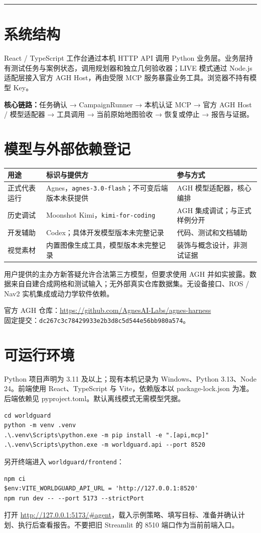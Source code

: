 \documentclass[UTF8,10pt,a4paper]{ctexart}
\newcommand{\cover}[2]{\vspace*{5mm}{\small\textcolor{teal}{WORLDGUARD / SUBMISSION 2026}}\par\vspace{4mm}{\huge\bfseries\color{ink}#1}\par\vspace{3mm}{\large #2}\par\vspace{4mm}\hrule\vspace{5mm}}
\begin{document}
\cover{技术信息与复现指南}{执行链、模型登记、环境与复核步骤}
\section{系统结构}
React / TypeScript 工作台通过本机 HTTP API 调用 Python 业务层。业务层持有测试任务与案例状态，调用规划器和独立几何验收器；LIVE 模式通过 Node.js 适配层接入官方 AGH Host，再由受限 MCP 服务暴露业务工具。浏览器不持有模型 Key。

\textbf{核心链路：}任务确认 → CampaignRunner → 本机认证 MCP → 官方 AGH Host / 模型适配器 → 工具调用 → 当前原始地图验收 → 恢复或停止 → 报告与证据。
\section{模型与外部依赖登记}
\par
\begin{tabularx}{\linewidth}{p{28mm}Xp{37mm}}\toprule
用途 & 标识与提供方 & 参与方式\\\midrule
正式代表运行 & Agnes，\texttt{agnes-3.0-flash}；不可变后端版本未获提供 & AGH 模型适配器，核心编排\\
历史调试 & Moonshot Kimi，\texttt{kimi-for-coding} & AGH 集成调试；与正式样例分开\\
开发辅助 & Codex；具体开发模型版本未完整记录 & 代码、测试和文档辅助\\
视觉素材 & 内置图像生成工具，模型版本未完整记录 & 装饰与概念设计，非测试证据\\\bottomrule
\end{tabularx}\par

用户提供的主办方新答疑允许合法第三方模型，但要求使用 AGH 并如实披露。数据来自自建合成网格和测试输入；无外部真实仓库数据集。无设备接口、ROS / Nav2 实机集成或动力学软件依赖。

官方 AGH 仓库：\url{https://github.com/AgnesAI-Labs/agnes-harness}\\
固定提交：\texttt{dc267c3c78429933e2b3d8c5d544e56bb980a574}。
\section{可运行环境}
Python 项目声明为 3.11 及以上；现有本机记录为 Windows、Python 3.13、Node 24。前端使用 React、TypeScript 与 Vite，依赖版本以 package-lock.json 为准。后端依赖见 pyproject.toml。默认离线模式无需模型凭据。
\begin{verbatim}
cd worldguard
python -m venv .venv
.\.venv\Scripts\python.exe -m pip install -e ".[api,mcp]"
.\.venv\Scripts\python.exe -m worldguard.api --port 8520
\end{verbatim}
另开终端进入 \texttt{worldguard/frontend}：
\begin{verbatim}
npm ci
$env:VITE_WORLDGUARD_API_URL = 'http://127.0.0.1:8520'
npm run dev -- --port 5173 --strictPort
\end{verbatim}
打开 \url{http://127.0.0.1:5173/\#agent}，载入示例策略、填写目标、准备并确认计划、执行后查看报告。不要把旧 Streamlit 的 8510 端口作为当前前端入口。
\end{document}
